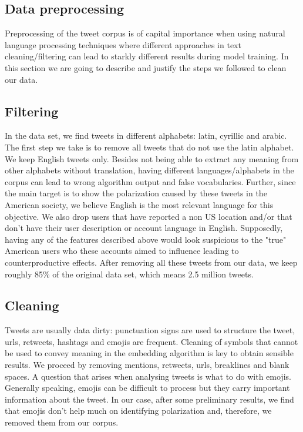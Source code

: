 \documentclass[12pt, authoryear]{elsarticle}
\begin{document}
\subsection{Data preprocessing}
    
Preprocessing of the tweet corpus is of capital importance when using natural language processing techniques where different approaches in text cleaning/filtering can lead to starkly different results during model training. In this section we are going to describe and justify the steps we followed to clean our data.
    
\subsection{Filtering}

In the data set, we find tweets in different alphabets: latin, cyrillic and arabic. The first step we take is to remove all tweets that do not use the latin alphabet. We keep English tweets only. Besides not being able to extract any meaning from other alphabets without translation, having different languages/alphabets in the corpus can lead to wrong algorithm output and false vocabularies. Further, since the main target is to show the polarization caused by these tweets in the American society, we believe English is the most relevant language for this objective. We also drop users that have reported a non US location and/or that don't have their user description or account language in English. Supposedly, having any of the features described above would look suspicious to the "true" American users who these accounts aimed to influence leading to counterproductive effects. After removing all these tweets from our data, we keep roughly 85\% of the original data set, which means 2.5 million tweets.

\subsection{Cleaning}

Tweets are usually data dirty: punctuation signs are used to structure the tweet, urls, retweets, hashtags and emojis are frequent. Cleaning of symbols that cannot be used to convey meaning in the embedding algorithm is key to obtain sensible results. We proceed by removing mentions, retweets, urls, breaklines and  blank spaces. A question that arises when analysing tweets is what to do with emojis. Generally speaking, emojis can be difficult to process but they carry important information about the tweet. In our case, after some preliminary results, we find that emojis don't help much on identifying polarization and, therefore, we removed them from our corpus.
\end{document}

